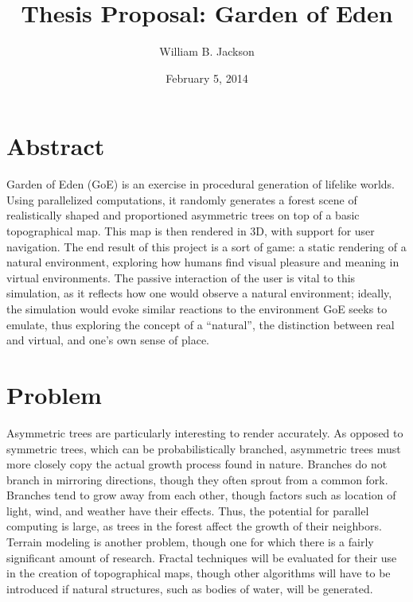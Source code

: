 \documentclass{article}
\title{Thesis Proposal: Garden of Eden}
\author{William B. Jackson}
\date{February 5, 2014}
\newcommand{\tab}{\hspace*{2em}}
\begin{document}
    \maketitle
    \section{Abstract}
\tab Garden of Eden (GoE) is an exercise in procedural generation of lifelike
worlds. Using parallelized computations, it randomly generates a forest scene of
realistically shaped and proportioned asymmetric trees on top of a basic
topographical map. This map is then rendered in 3D, with support for user
navigation. The end result of this project is a sort of game: a static rendering
of a natural environment, exploring how humans find visual pleasure and meaning
in virtual environments. The passive interaction of the user is vital to this
simulation, as it reflects how one would observe a natural environment; ideally,
the simulation would evoke similar reactions to the environment GoE seeks to
emulate, thus exploring the concept of a “natural”, the distinction between real
and virtual, and one's own sense of place.

    \section{Problem}
\tab Asymmetric trees are particularly interesting to render accurately. As
opposed to symmetric trees, which can be probabilistically branched, asymmetric
trees must more closely copy the actual growth process found in nature. Branches
do not branch in mirroring directions, though they often sprout from a common
fork. Branches tend to grow away from each other, though factors such as
location of light, wind, and weather have their effects. Thus, the potential for
parallel computing is large, as trees in the forest affect the growth of their
neighbors. Terrain modeling is another problem, though one for which there is a
fairly significant amount of research. Fractal techniques will be evaluated for
their use in the creation of topographical maps, though other algorithms will
have to be introduced if natural structures, such as bodies of water, will be
generated.
\end{document}
